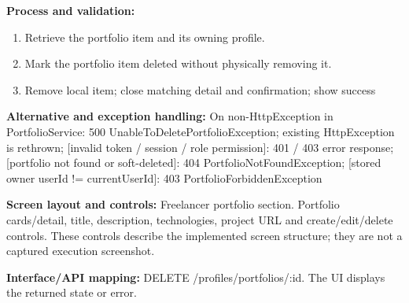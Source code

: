\textbf{Process and validation:}
\begin{enumerate}
\item Retrieve the portfolio item and its owning profile.
\item Mark the portfolio item deleted without physically removing it.
\item Remove local item; close matching detail and confirmation; show success
\end{enumerate}
\textbf{Alternative and exception handling:} On non-Http\allowbreak{}Exception in Portfolio\allowbreak{}Service: 500 Unable\allowbreak{}To\allowbreak{}Delete\allowbreak{}Portfolio\allowbreak{}Exception; existing Http\allowbreak{}Exception is rethrown; [invalid token /\allowbreak{} session /\allowbreak{} role permission]: 401 /\allowbreak{} 403 error response; [portfolio not found or soft-deleted]: 404 Portfolio\allowbreak{}Not\allowbreak{}Found\allowbreak{}Exception; [stored owner user\allowbreak{}Id !=\allowbreak{} current\allowbreak{}User\allowbreak{}Id]: 403 Portfolio\allowbreak{}Forbidden\allowbreak{}Exception

\textbf{Screen layout and controls:} Freelancer portfolio section. Portfolio cards/\allowbreak{}detail, title, description, technologies, project URL and create/\allowbreak{}edit/\allowbreak{}delete controls. These controls describe the implemented screen structure; they are not a captured execution screenshot.

\textbf{Interface/\allowbreak{}API mapping:} DELETE /\allowbreak{}profiles/\allowbreak{}portfolios/\allowbreak{}:id. The UI displays the returned state or error.

\endgroup
